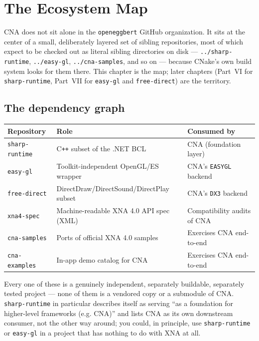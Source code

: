 \chapter{The Ecosystem Map}
\label{ch:ecosystem-map}

CNA does not sit alone in the \texttt{openeggbert} GitHub organization. It sits at the
center of a small, deliberately layered set of sibling repositories, most of which expect to
be checked out as literal sibling directories on disk --- \texttt{../sharp-runtime},
\texttt{../easy-gl}, \texttt{../cna-samples}, and so on --- because CNake's own build system
looks for them there. This chapter is the map; later chapters (Part~VI for
\texttt{sharp-runtime}, Part~VII for \texttt{easy-gl} and \texttt{free-direct}) are the
territory.

\section{The dependency graph}

\begin{center}
\begin{tabular}{lll}
\toprule
\textbf{Repository} & \textbf{Role} & \textbf{Consumed by} \\
\midrule
\texttt{sharp-runtime} & C\texttt{++} subset of the .NET BCL & CNA (foundation layer) \\
\texttt{easy-gl} & Toolkit-independent OpenGL/ES wrapper & CNA's \texttt{EASYGL} backend \\
\texttt{free-direct} & DirectDraw/DirectSound/DirectPlay subset & CNA's \texttt{DX3} backend \\
\texttt{xna4-spec} & Machine-readable XNA 4.0 API spec (XML) & Compatibility audits of CNA \\
\texttt{cna-samples} & Ports of official XNA 4.0 samples & Exercises CNA end-to-end \\
\texttt{cna-examples} & In-app demo catalog for CNA & Exercises CNA end-to-end \\
\bottomrule
\end{tabular}
\end{center}

Every one of these is a genuinely independent, separately buildable, separately tested
project --- none of them is a vendored copy or a submodule of CNA. \texttt{sharp-runtime} in
particular describes itself as serving ``as a foundation for higher-level frameworks (e.g.
CNA)'' and lists CNA as its own downstream consumer, not the other way around; you could, in
principle, use \texttt{sharp-runtime} or \texttt{easy-gl} in a project that has nothing to do
with XNA at all.

